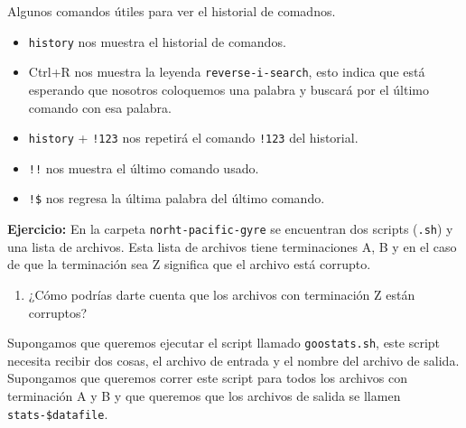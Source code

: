 \documentclass[
]{book}
\newenvironment{Shaded}{\begin{snugshade}}{\end{snugshade}}
\newcommand{\ExtensionTok}[1]{#1}
\newcommand{\NormalTok}[1]{#1}
\newcommand{\OperatorTok}[1]{\textcolor[rgb]{0.81,0.36,0.00}{\textbf{#1}}}
\newcommand{\VariableTok}[1]{\textcolor[rgb]{0.00,0.00,0.00}{#1}}
\providecommand{\tightlist}{%
  \setlength{\itemsep}{0pt}\setlength{\parskip}{0pt}}
\begin{document}
\begin{Shaded}
\end{Shaded}

Algunos comandos útiles para ver el historial de comadnos.

\begin{itemize}
\item
  \texttt{history} nos muestra el historial de comandos.
\item
  Ctrl+R nos muestra la leyenda \texttt{reverse-i-search}, esto indica que está esperando que nosotros coloquemos una palabra y buscará por el último comando con esa palabra.
\item
  \texttt{history} + \texttt{!123} nos repetirá el comando \texttt{!123} del historial.
\item
  \texttt{!!} nos muestra el último comando usado.
\item
  \texttt{!\$} nos regresa la última palabra del último comando.
\end{itemize}

\textbf{Ejercicio:} En la carpeta \texttt{norht-pacific-gyre} se encuentran dos scripts (\texttt{.sh}) y una lista de archivos. Esta lista de archivos tiene terminaciones A, B y en el caso de que la terminación sea Z significa que el archivo está corrupto.

\begin{enumerate}
\def\labelenumi{\arabic{enumi})}
\tightlist
\item
  ¿Cómo podrías darte cuenta que los archivos con terminación Z están corruptos?
\end{enumerate}

Supongamos que queremos ejecutar el script llamado \texttt{goostats.sh}, este script necesita recibir dos cosas, el archivo de entrada y el nombre del archivo de salida. Supongamos que queremos correr este script para todos los archivos con terminación A y B y que queremos que los archivos de salida se llamen \texttt{stats-\$datafile}.
\end{document}
